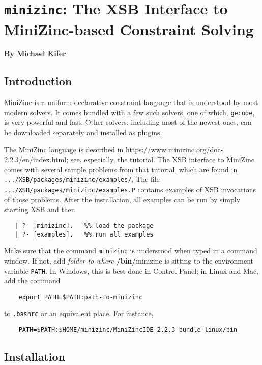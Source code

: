 
\chapter{{\tt minizinc}: The XSB Interface to MiniZinc-based Constraint
  Solving}

\begin{center}
  {\Large {\bf By Michael Kifer}}
\end{center}



\section{Introduction}

MiniZinc is a uniform declarative constraint language that is understood by
most modern solvers. It comes bundled with a few such solvers, one of
which, \texttt{gecode}, is very powerful and fast.  Other solvers,
including most of the newest ones, can be downloaded separately and
installed as plugins.

The MiniZinc language is described in
\url{https://www.minizinc.org/doc-2.2.3/en/index.html}; see, especially, the
tutorial. 
The XSB interface to MiniZinc comes with several sample problems from that
tutorial, which are found in \texttt{.../XSB/packages/minizinc/examples/}.
The file \texttt{.../XSB/packages/minizinc/examples.P} contains examples of
XSB invocations of those problems. After the installation, all examples can be run
by simply starting XSB and then
\begin{verbatim}
   | ?- [minizinc].   %% load the package
   | ?- [examples].   %% run all examples
\end{verbatim}

Make sure that the command \texttt{minizinc} is understood when typed in a
command window. If not, add \emph{folder-to-where-}\textbf{/bin/}minizinc is sitting to the
environment variable \texttt{PATH}.  In Windows, this is best done in
Control Panel; in Linux and Mac, add the command
\begin{verbatim}
    export PATH=$PATH:path-to-minizinc
\end{verbatim}
to \texttt{.bashrc} or an equivalent place. For instance,
\begin{verbatim}
    PATH=$PATH:$HOME/minizinc/MiniZincIDE-2.2.3-bundle-linux/bin
\end{verbatim}

\section{Installation}

